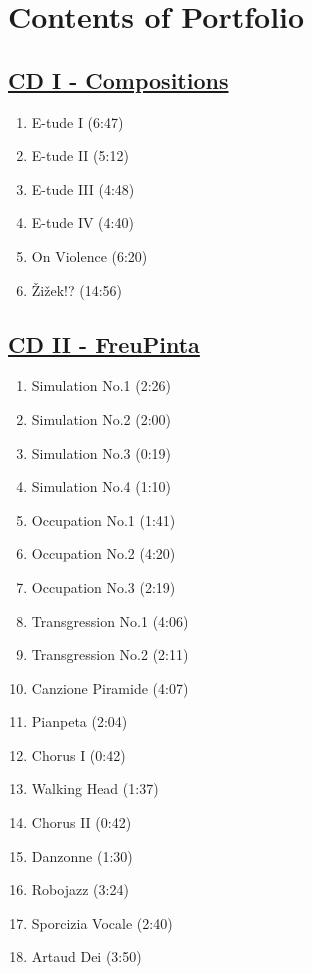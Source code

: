 \chapter*{Contents of Portfolio}
\hypertarget{portfolio}{}

\section*{\href{http://www.federicoreuben.com/phd/?page_id=26}{CD I - Compositions}}

\begin{enumerate}
\item E-tude I (6:47)
\item E-tude II (5:12)
\item E-tude III (4:48)
\item E-tude IV (4:40)
\item On Violence (6:20)
\item \v{Z}i\v{z}ek!? (14:56)
\end{enumerate}

\section*{\href{http://www.federicoreuben.com/phd/?page_id=21}{CD II - FreuPinta}}

\begin{enumerate}
\item Simulation No.1 (2:26)
\item Simulation No.2 (2:00)
\item Simulation No.3 (0:19)
\item Simulation No.4 (1:10)
\item Occupation No.1 (1:41)
\item Occupation No.2 (4:20)
\item Occupation No.3 (2:19)
\item Transgression No.1 (4:06)
\item Transgression No.2 (2:11)
\item Canzione Piramide (4:07)
\item Pianpeta (2:04)
\item Chorus I (0:42)
\item Walking Head (1:37)
\item Chorus II (0:42)
\item Danzonne (1:30)
\item Robojazz (3:24)
\item Sporcizia Vocale (2:40)
\item Artaud Dei (3:50)
\end{enumerate}

